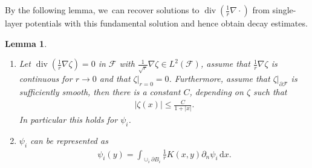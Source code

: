 \documentclass[10pt]{amsart}
\newtheorem{lemma}[theorem]{Lemma}
\theoremstyle{definition}
\renewcommand{\div}{\operatorname{div}}
\newcommand\eq{=}
\newcommand\dd{\,\mathrm{d}}
\newcommand\dx{\dd x}
\let\de\partial
\begin{document}
By the following lemma, we~can recover solutions to $\div(\frac{1}{r}\nabla\cdot)$ from single-layer potentials with this fundamental solution and hence obtain decay estimates.

\skpt
\begin{lemma}\label{rep psi}
\begin{enumerate}
\item\label{rep psia}
Let $\div(\frac{1}{r}\nabla\zeta)=0$ in $\mathcal{F}$ with $\frac{1}{\sqrt{r}}\nabla\zeta\in L^2(\mathcal{F})$, assume that $\frac{1}{r}\nabla\zeta$ is continuous for $r\to 0$ and that $\zeta|_{r=0}=0$. Furthermore, assume that $\zeta|_{\de\mathcal{F}}$ is sufficiently smooth, then there is a constant $C$, depending on $\zeta$ such that
\begin{align*}
|\zeta(x)|\leq \frac{C}{1+|x|}.
\end{align*}
In particular this holds for $\psi_i$.
\item\label{rep psib}
$\psi_i$ can be represented as
\begin{align*}
\psi_i(y)\eq\int_{\cup_i\de B_i}\frac{1}{r}K(x,y)\de_n\psi_i\dx.
\end{align*}
\end{enumerate}
\end{lemma}
\end{document}
